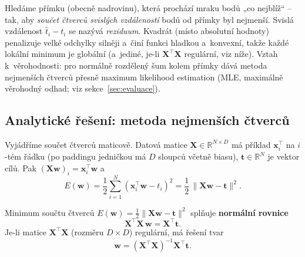 \begin{intuice}
Hledáme přímku (obecně nadrovinu), která prochází mraku bodů „co nejblíž`` -- tak, aby \emph{součet čtverců svislých vzdáleností} bodů od přímky byl nejmenší. Svislá vzdálenost $\hat t_i - t_i$ se nazývá \emph{reziduum}. Kvadrát (místo absolutní hodnoty) penalizuje velké odchylky silněji a~činí funkci hladkou a~konvexní, takže každé lokální minimum je globální (a~jediné, je-li $\mathbf{X}^{\!\top}\mathbf{X}$ regulární, viz níže). Vztah k~věrohodnosti: pro normálně rozdělený šum kolem přímky dává metoda nejmenších čtverců přesně maximum likelihood estimation (MLE, maximálně věrohodný odhad; viz sekce~\ref{sec:evaluace}).
\end{intuice}

\subsection{Analytické řešení: metoda nejmenších čtverců}

Vyjádříme součet čtverců maticově. Datová matice $\mathbf{X}\in\mathbb{R}^{N\times D}$ má příklad $\mathbf{x}_i^{\!\top}$ na $i$-tém řádku (po paddingu jedničkou má $D$ sloupců včetně biasu), $\mathbf{t}\in\mathbb{R}^N$ je vektor cílů. Pak $(\mathbf{X}\mathbf{w})_i=\mathbf{x}_i^{\!\top}\mathbf{w}$ a
\[ E(\mathbf{w})=\frac12\sum_{i=1}^N(\mathbf{x}_i^{\!\top}\mathbf{w}-t_i)^2=\frac12\,\|\mathbf{X}\mathbf{w}-\mathbf{t}\|^2. \]

\begin{veta}
Minimum součtu čtverců $E(\mathbf{w})=\tfrac12\|\mathbf{X}\mathbf{w}-\mathbf{t}\|^2$ splňuje \textbf{normální rovnice}
\[ \mathbf{X}^{\!\top}\mathbf{X}\,\mathbf{w}=\mathbf{X}^{\!\top}\mathbf{t}. \]
Je-li matice $\mathbf{X}^{\!\top}\mathbf{X}$ (rozměru $D\times D$) regulární, má řešení tvar
\[ \boxed{\;\mathbf{w}=(\mathbf{X}^{\!\top}\mathbf{X})^{-1}\mathbf{X}^{\!\top}\mathbf{t}.\;} \]
\end{veta}

